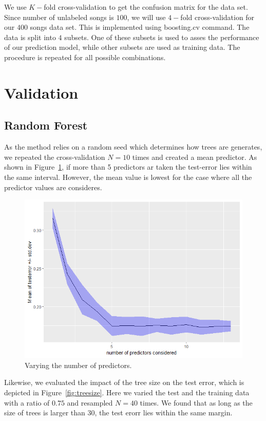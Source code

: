 \documentclass{article}
\begin{document}
We use $K-$fold cross-validation to get the confusion matrix for the data set. Since number of unlabeled songs is $100$, we will use $4-$fold cross-validation for our $400$ songs data set. This is implemented using {\selectfont boosting.cv} command. The data is split into $4$ subsets. One of these subsets is used to asses the performance of our prediction model, while other subsets are used as training data. The procedure is repeated for all possible combinations.

\section{Validation}

\subsection{Random Forest}

As the method relies on a random seed which determines how trees are generates, we repeated the cross-validation $N=10$ times and created a mean predictor.
As shown in Figure~\ref{fig:numpredictors}, if more than 5 predictors ar taken the test-error lies within the same interval.
However, the mean value is lowest for the case where all the predictor values are consideres.

\begin{figure}[htp!]
  \centering
  \includegraphics[height=0.5\textwidth] {figs/numpredictors.png}
  \caption{Varying the number of predictors.}
  \label{fig:numpredictors}
\end{figure}

Likewise, we evaluated the impact of the tree size on the test error, which is depicted in Figure~\ref{fig:treesize}.
Here we varied the test and the training data with a ratio of $0.75$ and resampled $N=40$ times.
We found that as long as the size of trees is larger than 30, the test erorr lies within the same margin.
\end{document}
